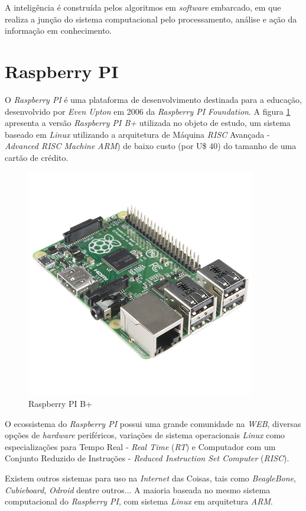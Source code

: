 A inteligência é construída pelos algoritmos em \textit{software} embarcado, em
que realiza a junção do sistema computacional pelo processamento, análise e
ação da informação em conhecimento.

\section{Raspberry PI}

O \textit{Raspberry PI} é uma plataforma de desenvolvimento destinada para a
educação, desenvolvido por \textit{Even Upton} em 2006 da \textit{Raspberry PI
  Foundation}. A figura \ref{fig:raspberrypi} apresenta a versão
\textit{Raspberry PI B+} utilizada no objeto de estudo, um sistema baseado em
\textit{Linux} utilizando a arquitetura de Máquina \textit{RISC} Avançada -
\textit{Advanced RISC Machine} \textit{ARM}) de baixo custo (por U\$ 40) do
tamanho de uma cartão de crédito.

\begin{figure}[H]
    \centering
    \includegraphics[width=10cm, height=10cm]{figuras/raspberrypi}
    \caption{Raspberry PI B+}
    \label{fig:raspberrypi}
\end{figure}

O ecossistema do \textit{Raspberry PI} possui uma grande comunidade na
\textit{WEB}, diversas opções de \textit{hardware} periféricos, variações de
sistema operacionais \textit{Linux} como especializações para Tempo Real -
\textit{Real Time} (\textit{RT}) e Computador com um Conjunto Reduzido de
Instruções - \textit{Reduced Instruction Set Computer} (\textit{RISC}).

Existem outros sistemas para uso na \textit{Internet} das Coisas, tais como
\textit{BeagleBone}, \textit{Cubieboard}, \textit{Odroid} dentre outros... A
maioria baseada no mesmo sistema computacional do \textit{Raspberry PI}, com
sistema \textit{Linux} em arquitetura \textit{ARM}.
